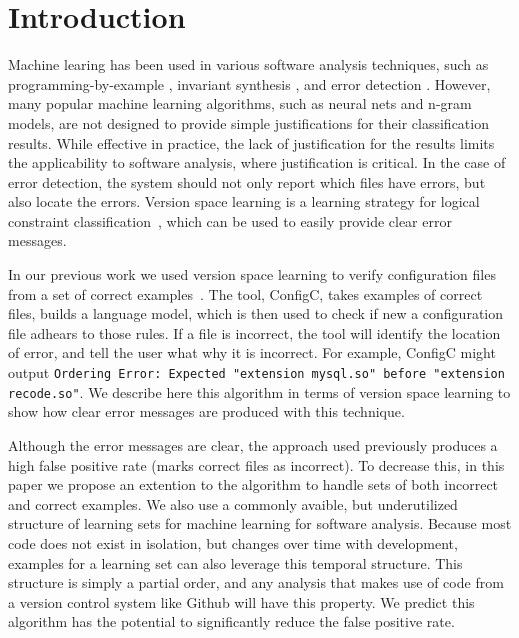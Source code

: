 \section{Introduction}

Machine learing has been used in various software analysis techniques, such as programming-by-example \cite{lau2000version}, invariant synthesis \cite{garg2014ice}, and error detection \cite{Santolucito2016}.
However, many popular machine learning algorithms, such as neural nets and n-gram models, are not designed to provide simple justifications for their classification results.
While effective in practice, the lack of justification for the results limits the applicability to software analysis, where justification is critical.
In the case of error detection, the system should not only report which files have errors, but also locate the errors.
Version space learning is a learning strategy for logical constraint classification~\cite{mitchell82}, which can be used to easily provide clear error messages.


In our previous work we used version space learning to verify configuration files from a set of correct examples~\cite{Santolucito2016}.
The tool, ConfigC, takes examples of correct files, builds a language model, which is then used to check if new a configuration file adhears to those rules.
If a file is incorrect, the tool will identify the location of error, and tell the user what why it is incorrect.
For example, ConfigC might output \texttt{Ordering Error: Expected "extension mysql.so" before "extension recode.so"}.
We describe here this algorithm in terms of version space learning to show how clear error messages are produced with this technique.

Although the error messages are clear, the approach used previously produces a high false positive rate (marks correct files as incorrect).
To decrease this, in this paper we propose an extention to the algorithm to handle sets of both incorrect and correct examples.
We also use a commonly avaible, but underutilized structure of learning sets for machine learning for software analysis.
Because most code does not exist in isolation, but changes over time with development, examples for a learning set can also leverage this temporal structure. 
This structure is simply a partial order, and any analysis that makes use of code from a version control system like Github will have this property.
We predict this algorithm has the potential to significantly reduce the false positive rate.

